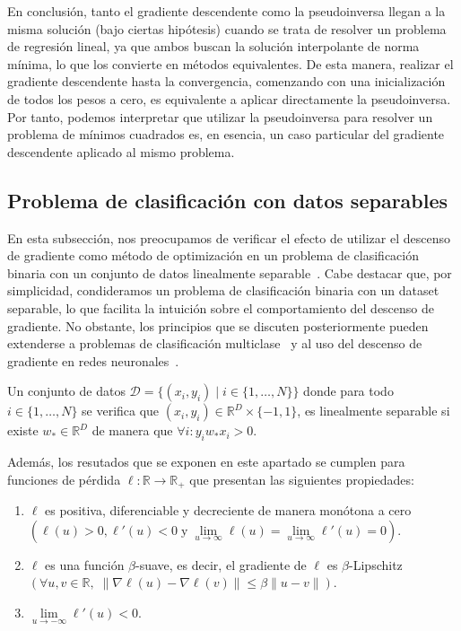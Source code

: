 En conclusión, tanto el gradiente descendente como la pseudoinversa llegan a la misma solución (bajo ciertas hipótesis) cuando se trata de resolver un problema de regresión lineal, ya que ambos buscan la solución interpolante de norma mínima, lo que los convierte en métodos equivalentes. De esta manera, realizar el gradiente descendente hasta la convergencia, comenzando con una inicialización de todos los pesos a cero, es equivalente a aplicar directamente la pseudoinversa. Por tanto, podemos interpretar que utilizar la pseudoinversa para resolver un problema de mínimos cuadrados es, en esencia, un caso particular del gradiente descendente aplicado al mismo problema.\newline

\subsection{Problema de clasificación con datos separables}\label{subsec:problema-clasificación-separable}
En esta subsección, nos preocupamos de verificar el efecto de utilizar el descenso de gradiente como método de optimización en un problema de clasificación binaria con un conjunto de datos linealmente separable~\cite{Soudry2024}. Cabe destacar que, por simplicidad, condideramos un problema de clasificación binaria con un dataset separable, lo que facilita la intuición sobre el comportamiento del descenso de gradiente. No obstante, los principios que se discuten posteriormente pueden extenderse a problemas de clasificación multiclase~\cite{Ravi2024} y al uso del descenso de gradiente en redes neuronales~\cite{Gunasekar2019}.\newline

\begin{definicion}
    Un conjunto de datos $\mathcal{D} = \{ (x_i, y_i) \; | \; i \in \{1, \ldots, N \}\}$ donde para todo $i \in \{1, \ldots, N \}$ se verifica que $(x_i, y_i) \in \mathbb{R}^{D} \times \{-1, 1\}$, es linealmente separable si existe $w_{*} \in \mathbb{R}^{D}$ de manera que $\forall i : y_i w_{*} x_i > 0$.\newline
\end{definicion}

Además, los resutados que se exponen en este apartado se cumplen para funciones de pérdida $\ell: \mathbb{R} \to \mathbb{R}_{+}$ que presentan las siguientes propiedades:
\begin{enumerate}
    \item\label{prop:positiva} $\ell$ es positiva, diferenciable y decreciente de manera monótona a cero $(\ell(u)>0, \ell'(u)<0 \; \text{y} \; \lim \limits_{u \to \infty} \ell(u) = \lim \limits_{u \to \infty} \ell'(u) = 0)$.
    \item\label{prop:smooth} $\ell$ es una función $\beta$-suave, es decir, el gradiente de $\ell$ es $\beta$-Lipschitz $(\forall u,v \in \mathbb{R}, \; \| \nabla \ell(u) - \nabla \ell(v) \| \leq \beta \| u-v \|)$.
    \item\label{prop:derivada_negativa} $\lim \limits_{u \to -\infty} \ell'(u) < 0$.\newline
\end{enumerate}

